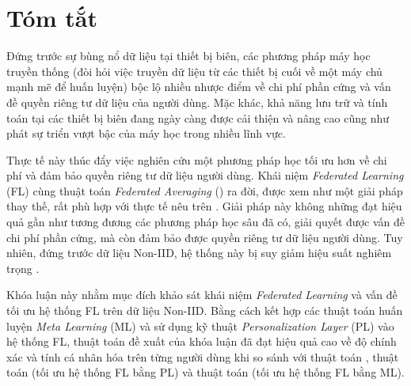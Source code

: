 \chapter*{Tóm tắt}
\label{abstract}

Đứng trước sự bùng nổ dữ liệu tại thiết bị biên, các phương pháp máy học truyền thống (đòi hỏi việc truyền dữ liệu từ các thiết bị cuối về một máy chủ mạnh mẽ để huấn luyện) bộc lộ nhiều nhược điểm về chi phí phần cứng và vấn đề quyền riêng tư dữ liệu của người dùng. Mặc khác, khả năng lưu trữ và tính toán tại các thiết bị biên đang ngày càng được cải thiện và nâng cao cũng như phát sự triển vượt bậc của máy học trong nhiều lĩnh vực. 

Thực tế này thúc đẩy việc nghiên cứu một phương pháp học tối ưu hơn về chi phí và đảm bảo quyền riêng tư dữ liệu người dùng. Khái niệm \textit{Federated Learning} (FL) cùng thuật toán \textit{Federated Averaging} () ra đời, được xem như một giải pháp thay thế, rất phù hợp với thực tế nêu trên \cite{mcmahan2017communication}. Giải pháp này không những đạt hiệu quả gần như tương đương các phương pháp học sâu đã có, giải quyết được vấn đề chi phí phần cứng, mà còn đảm bảo được quyền riêng tư dữ liệu người dùng. Tuy nhiên, đứng trước dữ liệu Non-IID, hệ thống này bị suy giảm hiệu suất nghiêm trọng \cite{zhao2018federated}.

Khóa luận này nhằm mục đích khảo sát khái niệm \textit{Federated Learning} và vấn đề tối ưu hệ thống FL trên dữ liệu Non-IID. Bằng cách kết hợp các thuật toán huấn luyện \textit{Meta Learning} \cite{hospedales2020meta} (ML) và sử dụng kỹ thuật \textit{Personalization Layer} \cite{zhu2021federated} (PL) vào hệ thống FL, thuật toán đề xuất của khóa luận đã đạt hiệu quả cao về độ chính xác và tính cá nhân hóa trên từng người dùng khi so sánh với thuật toán , thuật toán  \cite{arivazhagan2019federated} (tối ưu hệ thống FL bằng PL) và thuật toán  \cite{chen2018federated} (tối ưu hệ thống FL bằng ML).

